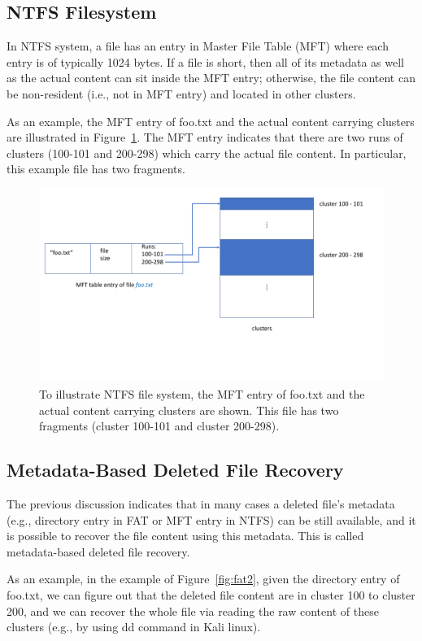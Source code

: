 \subsection{NTFS Filesystem}
In NTFS system, a file has an entry in Master File Table (MFT) where each entry is of typically 1024 bytes. 
If a file is short, then all of its metadata as well as the actual content can sit inside the MFT entry; otherwise, 
the file content can be non-resident (i.e., not in MFT entry) and located in other clusters.
  
As an example, the MFT entry of foo.txt and the actual content carrying clusters are illustrated in Figure~\ref{fig:ntfs}.
The MFT entry indicates that there are two runs of clusters (100-101 and 200-298) which carry the actual file content. 
In particular, this example file has two fragments.

\begin{figure}[h]
    \centering
    \includegraphics[width=\linewidth]{fig/ntfs.pdf}
    \caption{To illustrate NTFS file system, the MFT entry of foo.txt and the actual content carrying clusters are shown. 
This file has two fragments (cluster 100-101 and cluster 200-298).}
    \label{fig:ntfs}
\end{figure}
\subsection{Metadata-Based Deleted File Recovery}
The previous discussion indicates that in many cases a deleted file's metadata 
(e.g., directory entry in FAT or MFT entry in NTFS) can be still available, 
and it is possible to recover the file content using this metadata. 
This is called metadata-based deleted file recovery.

As an example, in the example of Figure~\ref{fig:fat2}, given the directory entry of foo.txt, 
we can figure out that the deleted file content are in cluster 100 to cluster 200, 
and we can recover the whole file via reading the raw content of these clusters (e.g., by using dd command in Kali linux). 


